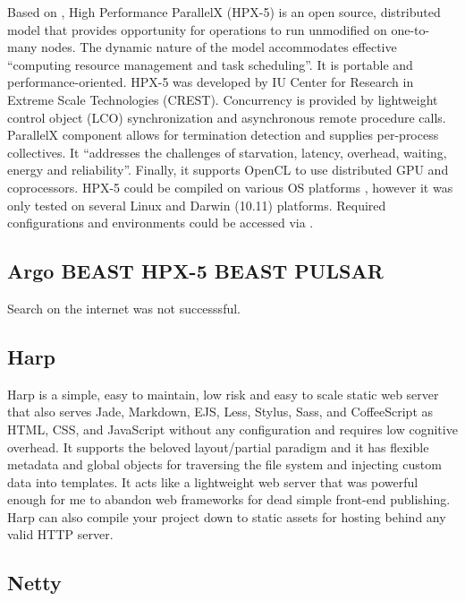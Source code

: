      Based on \cite{www-hpx-5}, High Performance ParallelX (HPX-5)
     is an open source, distributed model that provides opportunity
     for operations to run unmodified on one-to-many nodes. The
     dynamic nature of the model accommodates effective ``computing
     resource management and task scheduling''. It is portable and
     performance-oriented. HPX-5 was developed by IU Center for
     Research in Extreme Scale Technologies (CREST). Concurrency is
     provided by lightweight control object (LCO) synchronization and
     asynchronous remote procedure calls. ParallelX component allows
     for termination detection and supplies per-process
     collectives. It ``addresses the challenges of starvation, latency,
     overhead, waiting, energy and reliability''. Finally, it supports
     OpenCL to use distributed GPU and coprocessors. HPX-5 could be
     compiled on various OS platforms , however it was only tested on
     several Linux and Darwin (10.11) platforms. Required
     configurations and environments could be accessed via
     \cite{www-hpx-5-user-guide}.
	 
	 
\subsection{Argo BEAST HPX-5 BEAST PULSAR}

     Search on the internet was not successsful.
     
\subsection{Harp}

     Harp \cite{www-harp} is a simple, easy to maintain, low risk and
     easy to scale static web server that also serves Jade, Markdown,
     EJS, Less, Stylus, Sass, and CoffeeScript as HTML, CSS, and
     JavaScript without any configuration and requires low cognitive
     overhead. It supports the beloved layout/partial paradigm and it
     has flexible metadata and global objects for traversing the file
     system and injecting custom data into templates. It acts like a
     lightweight web server that was powerful enough for me to abandon
     web frameworks for dead simple front-end publishing. Harp can
     also compile your project down to static assets for hosting
     behind any valid HTTP server.
     
\subsection{Netty}

